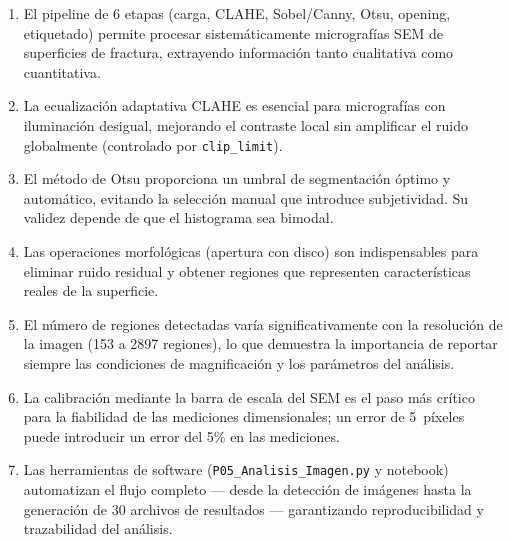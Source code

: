 \documentclass[12pt,a4paper]{article}
\begin{document}
\begin{enumerate}
	\item El pipeline de 6 etapas (carga, CLAHE, Sobel/Canny, Otsu,
	      opening, etiquetado) permite procesar sistemáticamente micrografías
	      SEM de superficies de fractura, extrayendo información tanto
	      cualitativa como cuantitativa.

	\item La ecualización adaptativa CLAHE es esencial para micrografías
	      con iluminación desigual, mejorando el contraste local sin
	      amplificar el ruido globalmente (controlado por
	      \texttt{clip\_limit}).

	\item El método de Otsu proporciona un umbral de segmentación óptimo
	      y automático, evitando la selección manual que introduce
	      subjetividad.  Su validez depende de que el histograma sea
	      bimodal.

	\item Las operaciones morfológicas (apertura con disco) son
	      indispensables para eliminar ruido residual y obtener regiones
	      que representen características reales de la superficie.

	\item El número de regiones detectadas varía significativamente con
	      la resolución de la imagen (153 a 2897 regiones), lo que
	      demuestra la importancia de reportar siempre las condiciones de
	      magnificación y los parámetros del análisis.

	\item La calibración mediante la barra de escala del SEM es el paso
	      más crítico para la fiabilidad de las mediciones dimensionales;
	      un error de 5~píxeles puede introducir un error del 5\% en las
	      mediciones.

	\item Las herramientas de software (\texttt{P05\_Analisis\_Imagen.py}
	      y notebook) automatizan el flujo completo --- desde la detección
	      de imágenes hasta la generación de 30 archivos de resultados ---
	      garantizando reproducibilidad y trazabilidad del análisis.
\end{enumerate}

\printbibliography[title={Referencias}]

\appendix
\end{document}
